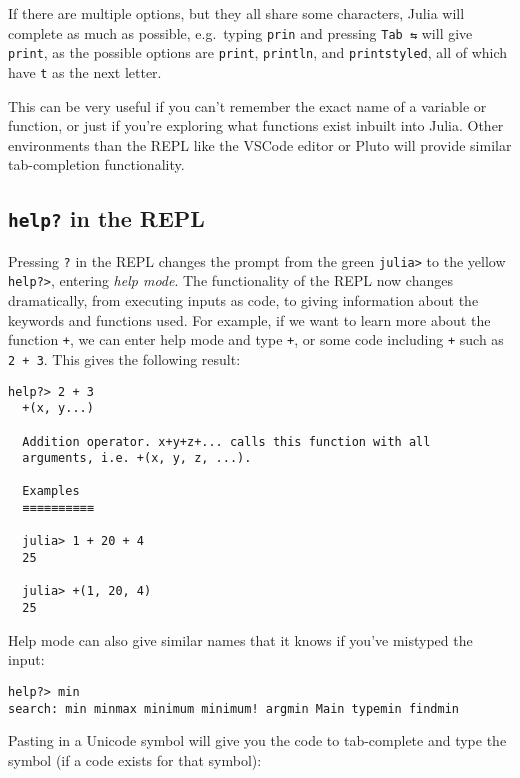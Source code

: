 \documentclass[
  letterpaper,
  DIV=11,
  numbers=noendperiod]{scrreprt}
\begin{document}
If there are multiple options, but they all share some characters, Julia
will complete as much as possible, e.g.~typing \texttt{prin} and
pressing \texttt{Tab\ ⇆} will give \texttt{print}, as the possible
options are \texttt{print}, \texttt{println}, and \texttt{printstyled},
all of which have \texttt{t} as the next letter.

This can be very useful if you can't remember the exact name of a
variable or function, or just if you're exploring what functions exist
inbuilt into Julia. Other environments than the REPL like the VSCode
editor or Pluto will provide similar tab-completion functionality.

\hypertarget{help-in-the-repl}{%
\subsection{\texorpdfstring{\texttt{help?} in the
REPL}{help? in the REPL}}\label{help-in-the-repl}}

Pressing \texttt{?} in the REPL changes the prompt from the green
\texttt{julia\textgreater{}} to the yellow \texttt{help?\textgreater{}},
entering \emph{help mode}. The functionality of the REPL now changes
dramatically, from executing inputs as code, to giving information about
the keywords and functions used. For example, if we want to learn more
about the function \texttt{+}, we can enter help mode and type
\texttt{+}, or some code including \texttt{+} such as \texttt{2\ +\ 3}.
This gives the following result:

\begin{verbatim}
help?> 2 + 3
  +(x, y...)

  Addition operator. x+y+z+... calls this function with all
  arguments, i.e. +(x, y, z, ...).

  Examples
  ≡≡≡≡≡≡≡≡≡≡

  julia> 1 + 20 + 4
  25
  
  julia> +(1, 20, 4)
  25
\end{verbatim}

Help mode can also give similar names that it knows if you've mistyped
the input:

\begin{verbatim}
help?> min
search: min minmax minimum minimum! argmin Main typemin findmin
\end{verbatim}

Pasting in a Unicode symbol will give you the code to tab-complete and
type the symbol (if a code exists for that symbol):
\end{document}

